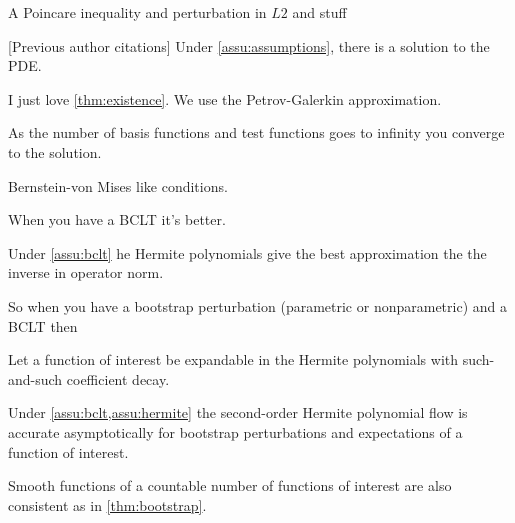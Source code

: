 
\begin{assu}\label{assu:assumptions}
A Poincare inequality and perturbation in $L2$ and stuff
\end{assu}



\begin{thm}\label{thm:existence}[Previous author citations]
    Under \cref{assu:assumptions}, there is a solution to the PDE.
\end{thm}

I just love \cref{thm:existence}.  We use the Petrov-Galerkin approximation.

\begin{thm}\label{thm:consistency}
    As the number of basis functions and test functions goes to infinity
    you converge to the solution.
\end{thm}


\begin{assu}\label{assu:bclt}
    Bernstein-von Mises like conditions.
\end{assu}

When you have a BCLT it's better.

\begin{thm}\label{thm:hermite}
    Under \cref{assu:bclt}
    he Hermite polynomials give the best approximation the the inverse in operator norm.
\end{thm}

So when you have a bootstrap perturbation (parametric or nonparametric)
and a BCLT then

\begin{assu}\label{assu:hermite}
    Let a function of interest be expandable in the Hermite polynomials
    with such-and-such coefficient decay.
\end{assu}


\begin{thm}\label{thm:bootstrap}
    Under \cref{assu:bclt,assu:hermite} the second-order Hermite polynomial flow
    is accurate asymptotically for bootstrap perturbations and expectations
    of a function of interest.
\end{thm}

\begin{cor}\label{cor:smooth}
    Smooth functions of a countable number of functions of interest are also consistent
    as in \cref{thm:bootstrap}.
\end{cor}

